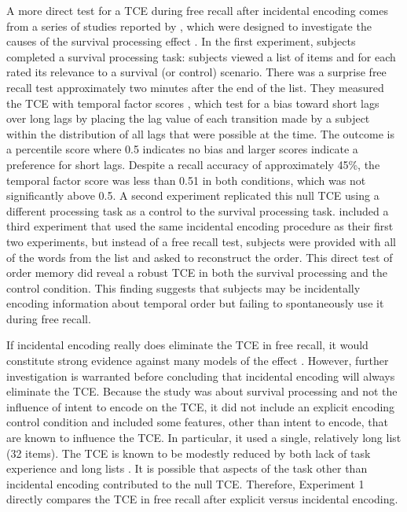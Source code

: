 \documentclass[man,natbib,floatsintext]{apa6} %
\begin{document}
A more direct test for a TCE during free recall after incidental encoding comes from a series of studies reported by \citet{NairEtal17}, which were designed to investigate the causes of the survival processing effect \citep{NairEtal07}. In the first experiment, subjects completed a survival processing task: subjects viewed a list of items and for each rated its relevance to a survival (or control) scenario. There was a surprise free recall test approximately two minutes after the end of the list. They measured the TCE with temporal factor scores \citep{PolyEtal09}, which test for a bias toward short lags over long lags by placing the lag value of each transition made by a subject within the distribution of all lags that were possible at the time. The outcome is a percentile score where 0.5 indicates no bias and larger scores indicate a preference for short lags. Despite a recall accuracy of approximately 45\%, the temporal factor score was less than 0.51 in both conditions, which was not significantly above 0.5. A second experiment replicated this null TCE using a different processing task as a control to the survival processing task. \citet{NairEtal17} included a third experiment that used the same incidental encoding procedure as their first two experiments, but instead of a free recall test, subjects were provided with all of the words from the list and asked to reconstruct the order. This direct test of order memory did reveal a robust TCE in both the survival processing and the control condition. This finding suggests that subjects may be incidentally encoding information about temporal order but failing to spontaneously use it during free recall.

If incidental encoding really does eliminate the TCE in free recall, it would constitute strong evidence against many models of the effect \citep[e.g.,][]{LohnEtal14,HealKaha17}. However, further investigation is warranted before concluding that incidental encoding will always eliminate the TCE. Because the \citet{NairEtal17} study was about survival processing and not the influence of intent to encode on the TCE, it did not include an explicit encoding control condition and included some features, other than intent to encode, that are known to influence the TCE. In particular, it used a single, relatively long list (32 items). The TCE is known to be modestly reduced by both lack of task experience and long lists \citep{HealKaha17}. It is possible that aspects of the task other than incidental encoding contributed to the null TCE. Therefore, Experiment 1 directly compares the TCE in \label{TODO-3} free recall after explicit versus incidental encoding.
\color{black}
\end{document}
